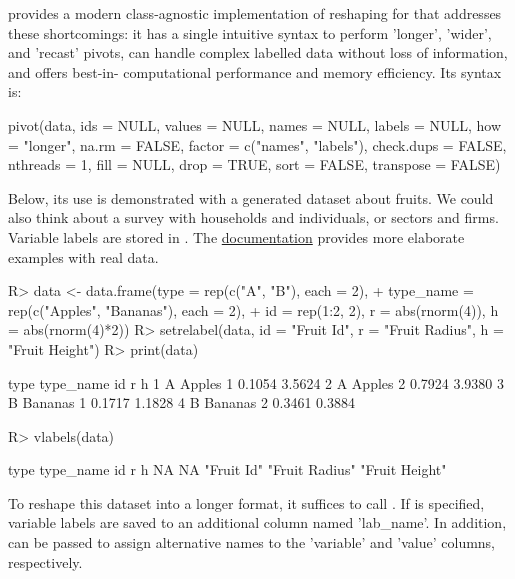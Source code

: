 \documentclass[article]{jss}
\begin{document}
 provides a modern class-agnostic implementation of reshaping for  that addresses these shortcomings: it has a single intuitive syntax to perform 'longer', 'wider', and 'recast' pivots, can handle complex labelled data without loss of information, and offers best-in- computational performance and memory efficiency. Its syntax is:
%
\begin{Code}
pivot(data, ids = NULL, values = NULL, names = NULL, labels = NULL,
      how = "longer", na.rm = FALSE, factor = c("names", "labels"),
      check.dups = FALSE, nthreads = 1, fill = NULL, drop = TRUE,
      sort = FALSE, transpose = FALSE)
\end{Code}
%
Below, its use is demonstrated with a generated dataset about fruits. We could also think about a survey with households and individuals, or sectors and firms. Variable labels are stored in . The \href{https://sebkrantz.github.io/collapse/reference/pivot.html#ref-examples}{documentation} provides more elaborate examples with real data.
%
\begin{Schunk}
\begin{Sinput}
R> data <- data.frame(type = rep(c("A", "B"), each = 2),
+              type_name = rep(c("Apples", "Bananas"), each = 2),
+              id = rep(1:2, 2), r = abs(rnorm(4)), h = abs(rnorm(4)*2))
R> setrelabel(data, id = "Fruit Id", r = "Fruit Radius", h = "Fruit Height")
R> print(data)
\end{Sinput}
\begin{Soutput}
  type type_name id      r      h
1    A    Apples  1 0.1054 3.5624
2    A    Apples  2 0.7924 3.9380
3    B   Bananas  1 0.1717 1.1828
4    B   Bananas  2 0.3461 0.3884
\end{Soutput}
\begin{Sinput}
R> vlabels(data)
\end{Sinput}
\begin{Soutput}
          type      type_name             id              r              h 
            NA             NA     "Fruit Id" "Fruit Radius" "Fruit Height" 
\end{Soutput}
\end{Schunk}
%
To reshape this dataset into a longer format, it suffices to call . If  is specified, variable labels are saved to an additional column named 'lab\_name'. In addition,  can be passed to assign alternative names to the 'variable' and 'value' columns, respectively.
\end{document}
